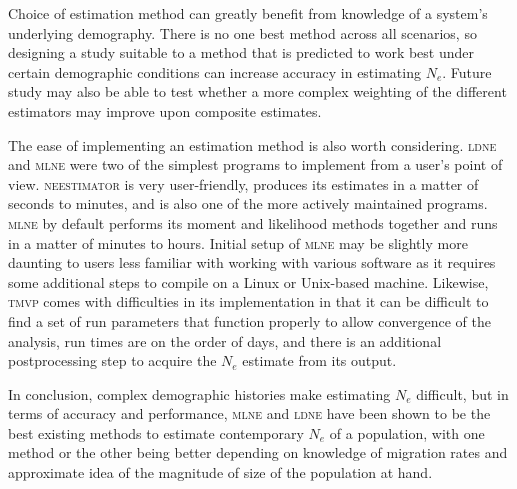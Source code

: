 Choice of estimation method can greatly benefit from knowledge of a system's underlying 
demography. There is no one best method across all scenarios, so designing a study suitable to 
a method that is predicted to work best under certain demographic conditions can increase 
accuracy in estimating $N_e$. Future study may also be able to test whether a more 
complex weighting of the different estimators may improve upon composite estimates.

The ease of implementing an estimation method is also worth considering. \textsc{ldne} 
and \textsc{mlne} were two of the simplest programs to implement from a user's point of view. 
\textsc{neestimator} is very user-friendly, produces its estimates in a matter of seconds to
minutes, and is also one of the more actively maintained programs. \textsc{mlne} by default 
performs its moment and likelihood methods together and runs in a matter of minutes to hours. 
Initial setup of \textsc{mlne} may be slightly more daunting to users less familiar with 
working with various software as it requires some additional steps to compile on a Linux 
or Unix-based machine. Likewise, \textsc{tmvp} comes with difficulties in its implementation 
in that it can be difficult to find a set of run parameters that function properly to allow 
convergence of the analysis, run times are on the order of days, and there is an additional 
postprocessing step to acquire the $N_e$ estimate from its output.

In conclusion, complex demographic histories make estimating $N_e$ difficult, 
but in terms of accuracy and performance, \textsc{mlne} and \textsc{ldne} have been shown 
to be the best existing methods to estimate contemporary $N_e$ of a population, 
with one method or the other being better depending on knowledge of migration rates and 
approximate idea of the magnitude of size of the population at hand.




